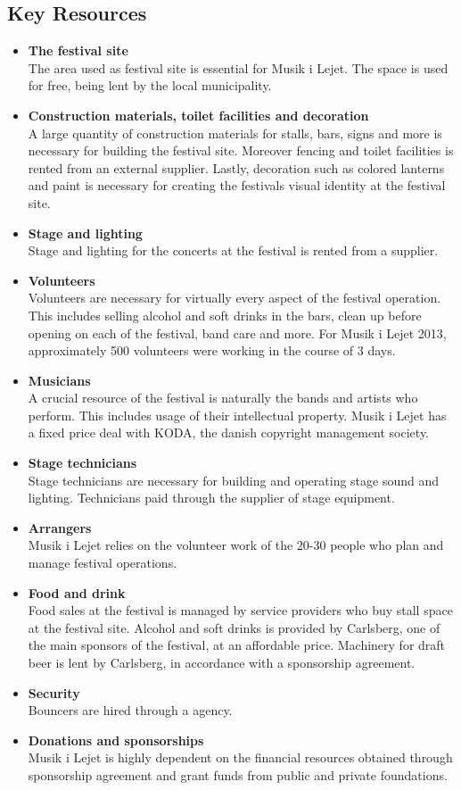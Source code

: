 \subsection{Key Resources} %
\label{sub:key_resources}
\begin{itemize}
	\item \textbf{The festival site}\\
	The area used as festival site is essential for Musik i Lejet. The space is used for free, being lent by the local municipality.
	\item \textbf{Construction materials, toilet facilities and decoration}\\
	A large quantity of construction materials for stalls, bars, signs and more is necessary for building the festival site. Moreover fencing and toilet facilities is rented from an external supplier. Lastly, decoration such as colored lanterns and paint is necessary for creating the festivals visual identity at the festival site.
	\item \textbf{Stage and lighting}\\
	Stage and lighting for the concerts at the festival is rented from a supplier.
	\item \textbf{Volunteers}\\
	Volunteers are necessary for virtually every aspect of the festival operation. This includes selling alcohol and soft drinks in the bars, clean up before opening on each of the festival, band care and more. For Musik i Lejet 2013, approximately 500 volunteers were working in the course of 3 days.
	\item \textbf{Musicians}\\
	A crucial resource of the festival is naturally the bands and artists who perform. This includes usage of their intellectual property. Musik i Lejet has a fixed price deal with KODA, the danish copyright management society.
	\item \textbf{Stage technicians}\\
	Stage technicians are necessary for building and operating stage sound and lighting. Technicians paid through the supplier of stage equipment.
	\item \textbf{Arrangers}\\
	Musik i Lejet relies on the volunteer work of the 20-30 people who plan and manage festival operations.
	\item \textbf{Food and drink}\\
	Food sales at the festival is managed by service providers who buy stall space at the festival site. Alcohol and soft drinks is provided by Carlsberg, one of the main sponsors of the festival, at an affordable price. Machinery for draft beer is lent by Carlsberg, in accordance with a sponsorship agreement.
	\item \textbf{Security}\\
	Bouncers are hired through a agency.
	\item \textbf{Donations and sponsorships}\\
	Musik i Lejet is highly dependent on the financial resources obtained through sponsorship agreement and grant funds from public and private foundations.
\end{itemize}

